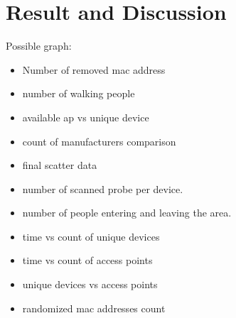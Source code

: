 \chapter{Result and Discussion}\label{ch:result-discussion} %
Possible graph:
\begin{itemize}
	\item Number of removed mac address
	\item number of walking people
	\item available ap vs unique device
	\item count of manufacturers comparison
	\item final scatter data
	\item number of scanned probe per device.
	\item number of people entering and leaving the area.
	\item time vs count of unique devices
	\item time vs count of access points
	\item unique devices vs access points
	\item randomized mac addresses count
\end{itemize}

